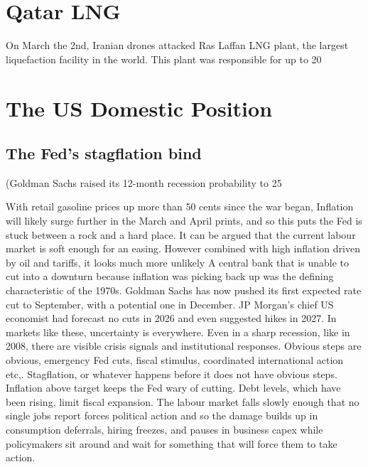\documentclass[12pt,a4paper]{article}
\begin{document}
\section{ Qatar LNG }

On March the 2nd, Iranian drones attacked Ras Laffan LNG plant, the largest liquefaction facility in the world. This plant was responsible for up to 20%

\section{The US Domestic Position}

\subsection{The Fed's stagflation bind}
(Goldman Sachs raised its 12-month recession probability to 25%

With retail gasoline prices up more than 50 cents since the war began, Inflation will likely surge further in the March and April prints, and so this puts the Fed is stuck between a rock and a hard place. It can be argued that the current labour market is soft enough for an easing. However combined with high inflation driven by oil and tariffs, it looks much more unlikely A central bank that is unable to cut into a downturn because inflation was picking back up was the defining characteristic of the 1970s. Goldman Sachs has now pushed its first expected rate cut to September, with a potential one in December. JP Morgan’s chief US economist had forecast no cuts in 2026 and even suggested hikes in 2027. In markets like these, uncertainty is everywhere. Even in a sharp recession, like in 2008, there are visible crisis signals and institutional responses. Obvious steps are obvious, emergency Fed cuts, fiscal stimulus, coordinated international action etc,. Stagflation, or whatever happens before it does not have obvious steps. Inflation above target keeps the Fed wary of cutting. Debt levels, which have been rising, limit fiscal expansion. The labour market falls slowly enough that no single jobs report forces political action and so the damage builds up in consumption deferrals, hiring freezes, and pauses in business capex while policymakers sit around and wait for something that will force them to take action.
\end{document}
